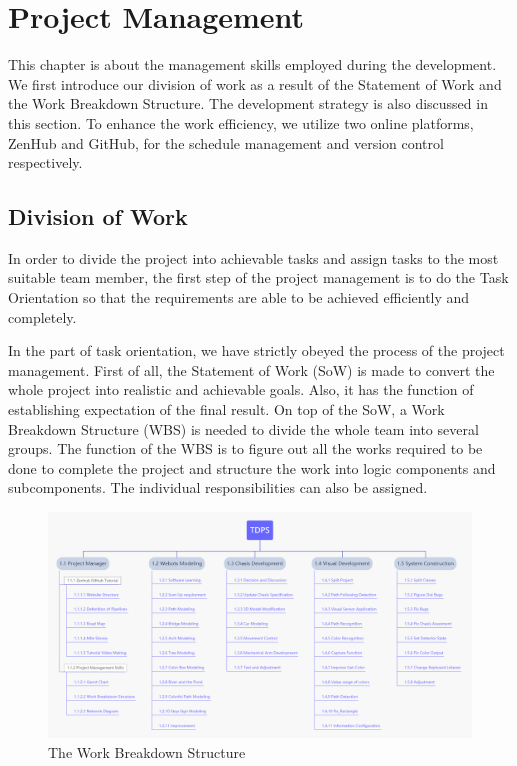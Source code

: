 \chapter{Project Management\label{chap3}}
This chapter is about the management skills employed during the development. We first introduce our division of work as a result of the Statement of Work and the Work Breakdown Structure. The development strategy is also discussed in this section. To enhance the work efficiency, we utilize two online platforms, ZenHub and GitHub, for the schedule management and version control respectively.
\section{Division of Work}
In order to divide the project into achievable tasks and assign tasks to the most suitable team member, the first step of the project management is to do the Task Orientation so that the requirements are able to be achieved efficiently and completely. 

In the part of task orientation, we have strictly obeyed the process of the project management. First of all, the Statement of Work (SoW) is made to convert the whole project into realistic and achievable goals. Also, it has the function of establishing expectation of the final result. On top of the SoW, a Work Breakdown Structure (WBS) is needed to divide the whole team into several groups. The function of the WBS is to figure out all the works required to be done to complete the project and structure the work into logic components and subcomponents. The individual responsibilities can also be assigned. 

\begin{figure}[htbp]
    \centering
    \includegraphics[width=14cm]{management/img_management/WBS.png}
    \caption{The Work Breakdown Structure}
    \label{fig:WBS}
\end{figure}

